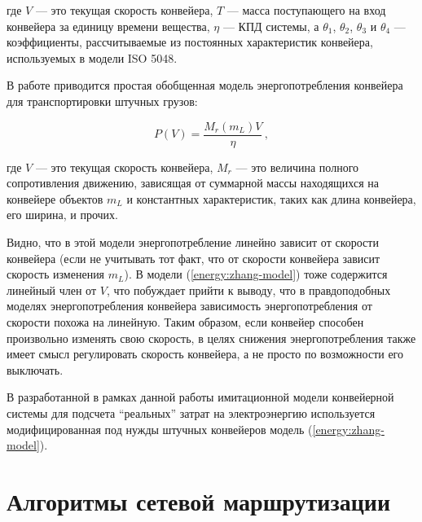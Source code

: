 \documentclass[specification,annotation,times]{itmo-student-thesis}
\theoremstyle{definition}
\newtheorem{definition-ru}{Определение}
\begin{document}
где $V$ --- это текущая скорость конвейера, $T$ --- масса поступающего на вход
конвейера за единицу времени вещества, $\eta$ --- КПД системы, а $\theta_1$,
$\theta_2$, $\theta_3$ и $\theta_4$ --- коэффициенты, рассчитываемые из
постоянных характеристик конвейера, используемых в модели ISO 5048. 

В работе \cite{halepoto2016design} приводится простая обобщенная модель
энергопотребления конвейера для транспортировки штучных грузов:

\begin{equation}\label{energy:linear-model}
  P(V) = \frac{M_r(m_L)V}{\eta} \,,
\end{equation}

где $V$ --- это текущая скорость конвейера, $M_r$ --- это величина полного
сопротивления движению, зависящая от суммарной массы находящихся на конвейере
объектов $m_L$ и константных характеристик, таких как длина конвейера, его
ширина, и прочих.

Видно, что в этой модели энергопотребление линейно зависит от
скорости конвейера (если не учитывать тот факт, что от скорости конвейера
зависит скорость изменения $m_L$). В модели (\ref{energy:zhang-model}) тоже содержится
линейный член от $V$, что побуждает прийти к выводу, что в правдоподобных
моделях энергопотребления конвейера зависимость энергопотребления от скорости
похожа на линейную. Таким образом, если конвейер способен произвольно изменять
свою скорость, в целях снижения энергопотребления также имеет смысл регулировать
скорость конвейера, а не просто по возможности его выключать.

В разработанной в рамках данной работы имитационной модели конвейерной системы
для подсчета ``реальных'' затрат на электроэнергию используется модифицированная
под нужды штучных конвейеров модель (\ref{energy:zhang-model}).





\section{Алгоритмы сетевой маршрутизации}\label{overview:networks}
\end{document}
